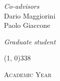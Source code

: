 \begin{titlepage}
\begin{center}
\begin{large}
\vspace{5pt} 

\begin{flushleft}
	\textit{Co-advisors}\\ 
	\vspace{5pt} 
	\profTitle Dario Maggiorini\\
	\profTitle Paolo Giaccone
\end{flushleft}

\begin{flushright}
\textit{Graduate student}\\ 
\vspace{5pt} 
\myName
\end{flushright}
\end{large}

\vspace{40pt}

\line(1, 0){338} \\
\begin{normalsize}
\textsc{Academic Year \myAA}
\end{normalsize}

\end{center}
\end{titlepage} 
